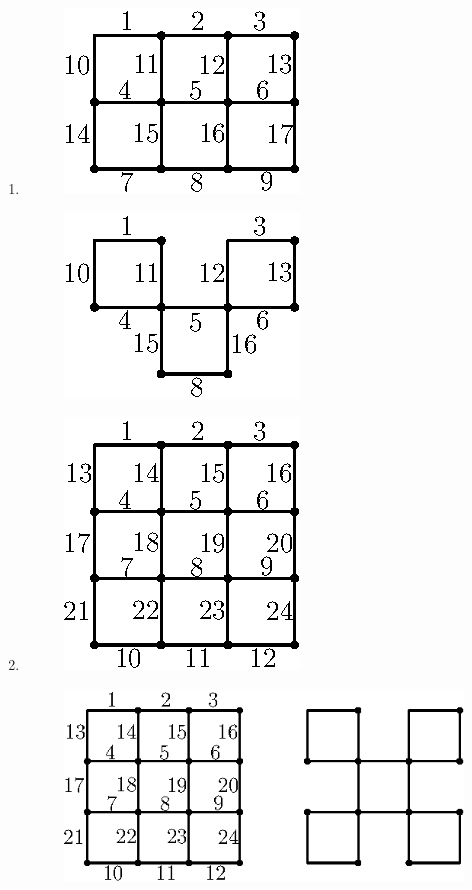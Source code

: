 \begin{enumerate}
\item
\begin{figure}[H]
\centering
\includegraphics{images/chap3/q14.eps}
\end{figure}

\begin{figure}[H]
\centering
\includegraphics{images/chap3/ans14.eps}
\end{figure}

\item
\begin{figure}[H]
\centering
\includegraphics{images/chap3/ans15a.eps}
\end{figure}


\begin{figure}[H]
\centering
\includegraphics{images/chap3/ans15.eps}
\end{figure}


\end{enumerate}
